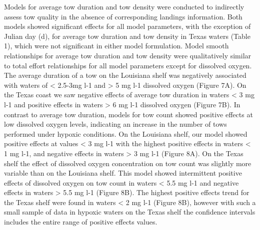 \documentclass[10pt]{article}
\begin{document}
Models for average tow duration and tow density were conducted to indirectly assess tow quality in the absence of corresponding landings information.  Both models showed significant effects for all model parameters, with the exception of Julian day (d), for average tow duration and tow density in Texas waters (Table 1), which were not significant in either model formulation.  Model smooth relationships for average tow duration and tow density were qualitatively similar to total effort relationships for all model parameters except for dissolved oxygen.  The average duration of a tow on the Louisiana shelf was negatively associated with waters of < 2.5-3mg l-1 and > 5 mg l-1 dissolved oxygen (Figure 7A).  On the Texas coast we saw negative effects of average tow duration in waters < 3 mg l-1 and positive effects in waters > 6 mg l-1 dissolved oxygen (Figure 7B).  In contrast to average tow duration, models for tow count showed positive effects at low dissolved oxygen levels, indicating an increase in the number of tows performed under hypoxic conditions.  On the Louisiana shelf, our model showed positive effects at values < 3 mg l-1 with the highest positive effects in waters < 1 mg l-1, and negative effects in waters > 3 mg l-1 (Figure 8A).  On the Texas shelf the effect of dissolved oxygen concentration on tow count was slightly more variable than on the Louisiana shelf.  This model showed intermittent positive effects of dissolved oxygen on tow count in waters < 5.5 mg l-1 and negative effects in waters > 5.5 mg l-1 (Figure 8B).  The highest positive effects trend for the Texas shelf were found in waters < 2 mg l-1 (Figure 8B), however with such a small sample of data in hypoxic waters on the Texas shelf the confidence intervals includes the entire range of positive effects values.  
\end{document}
